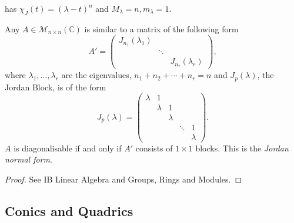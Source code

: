 \documentclass[a4paper]{article}
\begin{document}
    has $ \chi_J(t) = (\lambda-t)^n $ and $ M_\lambda=n,m_\lambda=1 $.
    \begin{theorem}
      Any $ A\in \mathcal{M}_{n\times n}(\mathbb{C}) $ is similar to
      a matrix of the following form
      \[
        A'=
        \begin{pmatrix}
          \boxed{J_{n_1}(\lambda_1)}&&\\
          &\ddots&\\
          &&\boxed{J_{n_r}(\lambda_r)}
        \end{pmatrix},
      \]
      where $\lambda_1,\ldots,\lambda_r$ are the eigenvalues,
      $n_1+n_2+\cdots+n_r=n$ and $J_p(\lambda)$, the Jordan Block, is
      of the form
      \[
        J_p(\lambda)=
        \begin{pmatrix}
          \lambda&1&&&\\
          &\lambda&1&&\\
          &&\lambda&&\\
          &&&\ddots&1\\
          &&&&\lambda
        \end{pmatrix}.
      \]
      $A$ is diagonalisable if and only if $A'$ consists of $1\times
      1$ blocks. This is the \textit{Jordan normal form}.
    \end{theorem}
    \begin{proof}
      See IB Linear Algebra and Groups, Rings and Modules.
    \end{proof}
    \subsection{Conics and Quadrics}
\end{document}
